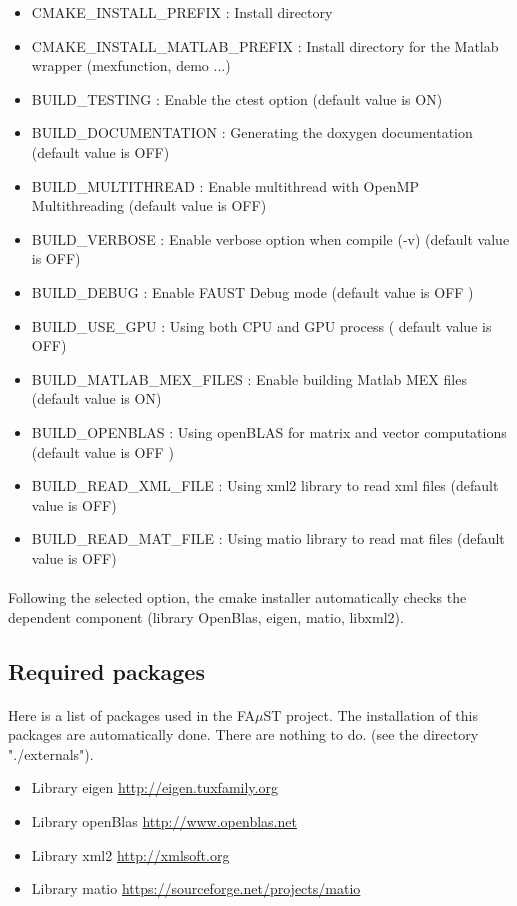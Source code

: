 \begin{itemize}
\item CMAKE\_INSTALL\_PREFIX : Install directory
\item CMAKE\_INSTALL\_MATLAB\_PREFIX : Install directory for the Matlab wrapper (mexfunction, demo ...)
\item BUILD\_TESTING : Enable the ctest option (default value is ON)
\item BUILD\_DOCUMENTATION : Generating the doxygen documentation (default value is OFF)  
\item BUILD\_MULTITHREAD : Enable multithread with OpenMP Multithreading (default value is OFF)
\item BUILD\_VERBOSE : Enable verbose option when compile (-v) (default value is OFF)
\item BUILD\_DEBUG : Enable FAUST Debug mode (default value is OFF )
\item BUILD\_USE\_GPU : Using both CPU and GPU process ( default value is OFF)
\item BUILD\_MATLAB\_MEX\_FILES : Enable building Matlab MEX files (default value is ON)
\item BUILD\_OPENBLAS : Using openBLAS for matrix and vector computations (default value is OFF )
\item BUILD\_READ\_XML\_FILE : Using xml2 library to read xml files (default value is OFF)
\item BUILD\_READ\_MAT\_FILE : Using matio library to read mat files (default value is OFF)
\end{itemize}

\paragraph{}Following the selected option, the cmake installer automatically checks the dependent component (library OpenBlas, eigen, matio, libxml2).  








\subsection{Required packages}\label{sec:RequiredPackages}

\paragraph{}Here is a list of packages used in the FA$\mu$ST project. The installation of this packages are automatically done. There are nothing to do. (see the directory "./externals").
\begin{itemize}
\item Library eigen \url{http://eigen.tuxfamily.org}
\item Library openBlas \url{http://www.openblas.net}
\item Library xml2 \url{http://xmlsoft.org}
\item Library matio \url{https://sourceforge.net/projects/matio}
\end{itemize}


